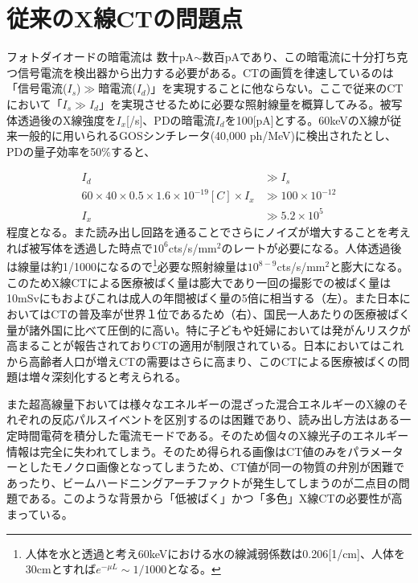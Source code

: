 \section{従来のX線CTの問題点}
フォトダイオードの暗電流は 数十pA$\sim$数百pAであり、この暗電流に十分打ち克つ信号電流を検出器から出力する必要がある。CTの画質を律速しているのは「信号電流($I_s$)$\gg$暗電流($I_d$)」を実現することに他ならない。ここで従来のCTにおいて「$I_s\gg I_d$」を実現させるために必要な照射線量を概算してみる。被写体透過後のX線強度を$I_x$[/s]、PDの暗電流$I_d$を100[pA]とする。60keVのX線が従来一般的に用いられるGOSシンチレータ(40,000 ph/MeV)に検出されたとし、PDの量子効率を50\%すると、

\begin{align}
I_d&\gg I_s\\
60\times40\times0.5\times1.6\times10^{-19} [C] \times I_x&\gg100\times10^{-12}\\
I_x&\gg 5.2\times10^5
\end{align}
程度となる。また読み出し回路を通ることでさらにノイズが増大することを考えれば被写体を透過した時点で$10^{6}$cts/s/mm$^2$のレートが必要になる。人体透過後は線量は約1/1000になるので\footnote{人体を水と透過と考え60keVにおける水の線減弱係数は0.206[1/cm]、人体を30cmとすれば$e^{-\mu L}\sim1/1000$となる。}必要な照射線量は$10^{8-9}$cts/s/mm$^2$と膨大になる。このためX線CTによる医療被ばく量は膨大であり一回の撮影での被ばく量は10mSvにもおよびこれは成人の年間被ばく量の5倍に相当する（左）。また日本においてはCTの普及率が世界１位であるため（右）、国民一人あたりの医療被ばく量が諸外国に比べて圧倒的に高い。特に子どもや妊婦においては発がんリスクが高まることが報告されておりCTの適用が制限されている。日本においてはこれから高齢者人口が増えCTの需要はさらに高まり、このCTによる医療被ばくの問題は増々深刻化すると考えられる。

また超高線量下おいては様々なエネルギーの混ざった混合エネルギーのX線のそれぞれの反応パルスイベントを区別するのは困難であり、読み出し方法はある一定時間電荷を積分した電流モードである。そのため個々のX線光子のエネルギー情報は完全に失われてしまう。そのため得られる画像はCT値のみをパラメーターとしたモノクロ画像となってしまうため、CT値が同一の物質の弁別が困難であったり、ビームハードニングアーチファクトが発生してしまうのが二点目の問題である。このような背景から「低被ばく」かつ「多色」X線CTの必要性が高まっている。


